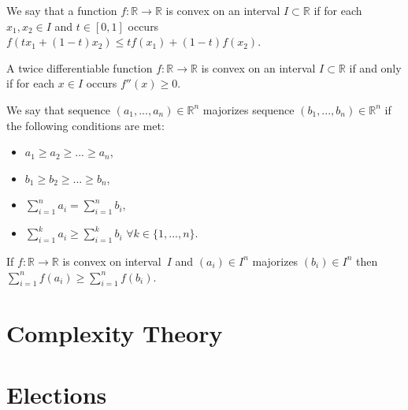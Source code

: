\begin{defn}
We say that a function $f:\mathbb{R}\rightarrow\mathbb{R}$ is convex on an interval $I \subset \mathbb{R}$
if for each $x_1, x_2 \in I$ and $t \in [0,1]$ occurs $f(t x_1 + (1-t) x_2) \leq tf(x_1) + (1-t)f(x_2)$.
\end{defn}

\begin{prp}
A twice differentiable function $f:\mathbb{R}\rightarrow\mathbb{R}$ is convex on an interval $I \subset \mathbb{R}$
if and only if for each $x \in I$ occurs $f''(x) \geq 0$.
\end{prp}

\begin{defn}
We say that sequence $(a_1, ..., a_n) \in \mathbb{R}^n$ majorizes sequence $(b_1, ..., b_n) \in \mathbb{R}^n$
if the following conditions are met:
\begin{itemize}
	\item $a_1 \geq a_2 \geq ... \geq a_n$,
	\item $b_1 \geq b_2 \geq ... \geq b_n$,
	\item $\sum_{i=1}^n a_i = \sum_{i=1}^n b_i$,
	\item $\sum_{i=1}^k a_i \geq \sum_{i=1}^k b_i$ $\forall k \in \{ 1, ..., n\}$.
\end{itemize}
\end{defn}

\begin{thm}
If $f:\mathbb{R}\rightarrow\mathbb{R}$ is convex on interval~$I$
and $(a_i) \in I^n$ majorizes $(b_i) \in I^n$ then
$\sum_{i=1}^n f(a_i) \geq \sum_{i=1}^n f(b_i)$.
\end{thm}


\section{Complexity Theory}


\section{Elections} 